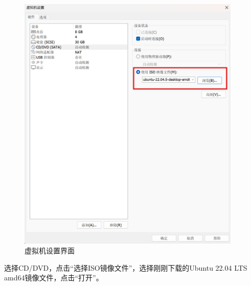 \documentclass[UTF8]{ctexart}
\begin{document}
\begin{figure}[H]
    \centering
    \includegraphics[width=0.95\textwidth]{picture/Screenshot 2024-10-14 114016.png}
    \caption{虚拟机设置界面}
\end{figure}
选择CD/DVD，点击“选择ISO镜像文件”，选择刚刚下载的Ubuntu 22.04 LTS amd64镜像文件，点击“打开”。
\end{document}
